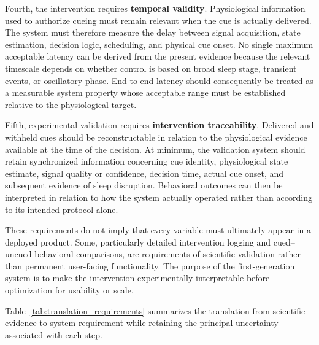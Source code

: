 Fourth, the intervention requires \textbf{temporal validity}. Physiological
information used to authorize cueing must remain relevant when the cue is
actually delivered. The system must therefore measure the delay between signal
acquisition, state estimation, decision logic, scheduling, and physical cue
onset. No single maximum acceptable latency can be derived from the present
evidence because the relevant timescale depends on whether control is based on
broad sleep stage, transient events, or oscillatory phase. End-to-end latency
should consequently be treated as a measurable system property whose acceptable
range must be established relative to the physiological target.

Fifth, experimental validation requires \textbf{intervention traceability}.
Delivered and withheld cues should be reconstructable in relation to the
physiological evidence available at the time of the decision. At minimum, the
validation system should retain synchronized information concerning cue
identity, physiological state estimate, signal quality or confidence,
decision time, actual cue onset, and subsequent evidence of sleep disruption.
Behavioral outcomes can then be interpreted in relation to how the system
actually operated rather than according to its intended protocol alone.

These requirements do not imply that every variable must ultimately appear in
a deployed product. Some, particularly detailed intervention logging and
cued--uncued behavioral comparisons, are requirements of scientific validation
rather than permanent user-facing functionality. The purpose of the
first-generation system is to make the intervention experimentally
interpretable before optimization for usability or scale.

Table~\ref{tab:translation_requirements} summarizes the translation from
scientific evidence to system requirement while retaining the principal
uncertainty associated with each step.

